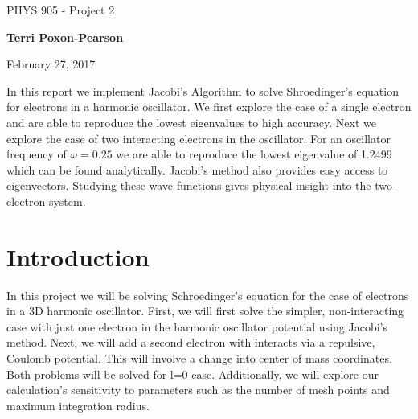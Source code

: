 \documentclass[%
oneside,                 %
final,                   %
10pt]{article}
\begin{document}

\newcommand{\exercisesection}[1]{\subsection*{#1}}






\thispagestyle{empty}

\begin{center}
{\LARGE\bf
\begin{spacing}{1.25}
PHYS 905 - Project 2
\end{spacing}
}
\end{center}


\begin{center}
{\bf Terri Poxon-Pearson}
\end{center}

    

\begin{center}
February 27, 2017
\end{center}

\vspace{1cm}

In this report we implement Jacobi's Algorithm to solve Shroedinger's equation for electrons in a harmonic oscillator.  We first explore the case of a single electron and are able to reproduce the lowest eigenvalues to high accuracy.  Next we explore the case of two interacting electrons in the oscillator.  For an oscillator frequency of $\omega = 0.25$ we are able to reproduce the lowest eigenvalue of 1.2499 which can be found analytically.  Jacobi's method also provides easy access to eigenvectors.  Studying these wave functions gives physical insight into the two-electron system.

\tableofcontents
 
\section{Introduction}
In this project we will be solving Schroedinger's equation for the case of electrons in a 3D harmonic oscillator. First, we will first solve the simpler, non-interacting case with just one electron in the harmonic oscillator potential using Jacobi's method. Next, we will add a second electron with interacts via a repulsive, Coulomb potential.  This will involve a change into center of mass coordinates.  Both problems will be solved for l=0 case.  Additionally, we will explore our calculation's sensitivity to parameters such as the number of mesh points and maximum integration radius.
\end{document}
